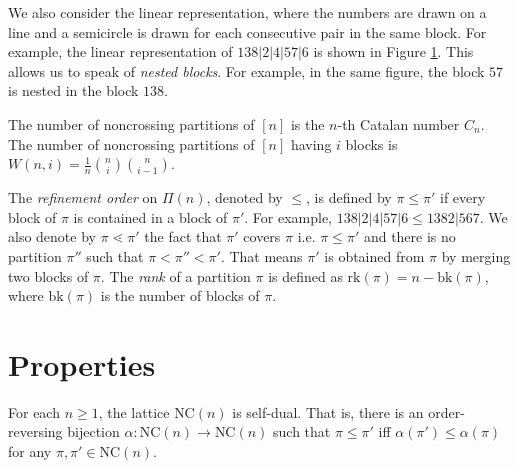 We also consider the linear representation, where the numbers are drawn on a line and a semicircle is drawn for each consecutive pair in the same block. For example, the linear representation of $138|2|4|57|6$ is shown in Figure \ref{fig:2}. This allows us to speak of \textit{nested blocks}. For example, in the same figure, the block $57$ is nested in the block $138$.

\begin{figure}[ht]
  \centering
  \caption{}
  \label{fig:2}
\end{figure}

The number of noncrossing partitions of $[n]$ is the $n$-th Catalan number $C_n$. The number of noncrossing partitions of $[n]$ having $i$ blocks is $W(n,i)=\frac{1}{n}\binom{n}{i}\binom{n}{i-1}$.

The \textit{refinement order} on $\Pi(n)$, denoted by $\leq$,  is defined by $\pi \leq \pi'$ if every block of $\pi$ is contained in a block of $\pi'$. For example, $138|2|4|57|6 \leq1382|567$. We also denote by $\pi\lessdot \pi'$ the fact that $\pi'$ covers $\pi$ i.e. $\pi \leq \pi'$ and there is no partition $\pi''$ such that $\pi < \pi'' < \pi'$. That means $\pi'$ is obtained from $\pi$ by merging two blocks of $\pi$. The \textit{rank} of a partition $\pi$ is defined as $\text{rk}(\pi) = n - \text{bk}(\pi)$, where $\text{bk}(\pi)$ is the number of blocks of $\pi$.

\section{Properties}
\begin{theorem}
  For each $n\ge 1$, the lattice $\text{NC}(n)$ is self-dual. That is, there is an order-reversing bijection $\alpha: \text{NC}(n) \to \text{NC}(n)$ such that $\pi \leq \pi'$ iff $\alpha(\pi') \leq \alpha(\pi)$ for any $\pi, \pi' \in \text{NC}(n)$.
\end{theorem}

